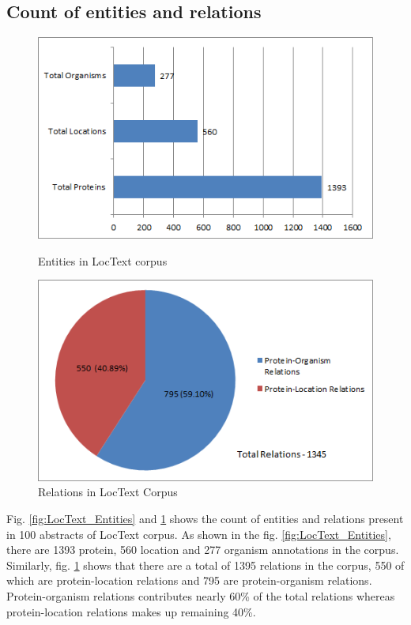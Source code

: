\subsection*{Count of entities and relations}

\begin{figure}
\centering
\begin{minipage}{.5\textwidth}
  \centering
  \includegraphics[width=.95\textwidth]{figures/ProtLocOrg_Distribution.png}
  \caption{Entities in LocText corpus}
  \label{fig:LocText_Entities}
\end{minipage}%
\begin{minipage}{.5\textwidth}
  \centering
  \includegraphics[width=.95\textwidth]{figures/AllRelationsPie.png}
  \caption{Relations in LocText Corpus}
  \label{fig:LocText_Relations}
\end{minipage}
\end{figure}

Fig. \ref{fig:LocText_Entities} and \ref{fig:LocText_Relations} shows the count of entities and relations present in 100 abstracts of LocText corpus. As shown in the fig. \ref{fig:LocText_Entities}, there are 1393 protein, 560 location and 277 organism annotations in the corpus. Similarly, fig. \ref{fig:LocText_Relations} shows that there are a total of 1395 relations in the corpus, 550 of which are protein-location relations and 795 are protein-organism relations. Protein-organism relations contributes nearly 60\% of the total relations whereas protein-location relations makes up remaining 40\%.

